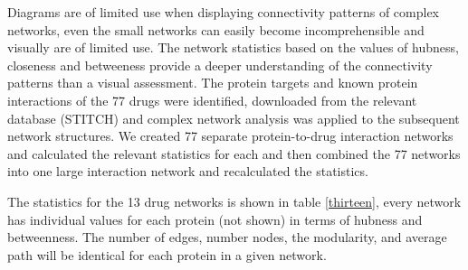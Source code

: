 \documentclass[preprint,12pt]{elsarticle}
\begin{document}
Diagrams are of limited use when displaying connectivity patterns of complex networks, even the small networks can easily become incomprehensible  and visually are of limited use. The network statistics based on the values of hubness, closeness and betweeness provide a deeper understanding of the connectivity patterns than a visual assessment. The protein targets and known protein interactions of the 77 drugs were identified, downloaded from the relevant database (STITCH) and complex network analysis was applied to the subsequent network structures.  We created 77 separate protein-to-drug interaction networks and calculated the relevant statistics for each and then combined the 77 networks into one large interaction network and recalculated the statistics. 

The statistics for the 13 drug networks is shown in table \ref{thirteen}, every network has individual values for each protein (not shown) in terms of hubness and betweenness. The number of edges, number nodes, the modularity, and average path will be identical for each protein in a given network.
\end{document}
